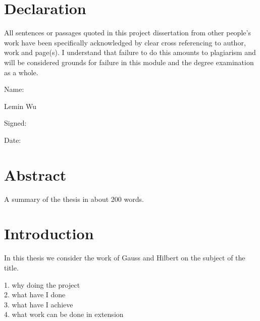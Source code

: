 \documentclass{report}
\begin{document}
\chapter*{Declaration}                %
All sentences or passages quoted in this project dissertation from other
people's work have been specifically acknowledged by clear cross referencing
to author, work and page(s).  I understand that failure to do this amounts
to plagiarism and will be considered grounds for failure in this module and
the degree examination as a whole.

\bigskip

\noindent
Name:

Lemin Wu\\


\bigskip

\noindent
Signed:


\bigskip

\noindent
Date:


\chapter*{Abstract}

A summary of the thesis in about 200 words.









\chapter*{Introduction}


In this thesis we consider the work of Gauss \cite[ch 2]{bib:Gauss}
and Hilbert \cite{bib:Hilbert1} on the subject of the title.



1. why doing the project\\
2. what have I done\\
3. what have I achieve\\
4. what work can be done in extension\\
\end{document}
